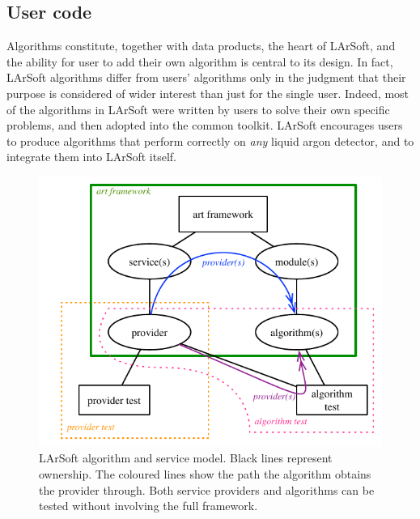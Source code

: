 \subsection{User code}
\label{ssec:Development:UserCode}

Algorithms constitute, together with data products, the heart of LArSoft,
and the ability for user to add their own algorithm is central to its design.
In fact, LArSoft algorithms differ from users' algorithms
only in the judgment that their purpose is considered of wider interest
than just for the single user.
Indeed, most of the algorithms in LArSoft were written by users to solve their own specific problems,
and then adopted into the common toolkit.
LArSoft encourages users to produce algorithms that perform correctly on \emph{any} liquid argon detector,
and to integrate them into LArSoft itself.

\begin{figure}
   \centering
   \includegraphics{figures/LArSoftFactorizationModelAndTests.pdf}
   \caption{\label{fig:AlgorithmModel}LArSoft algorithm and service model.
      Black lines represent ownership.
      The coloured lines show the path the algorithm obtains the provider through.
      Both service providers and algorithms can be tested without involving the full framework.
   }
\end{figure}

